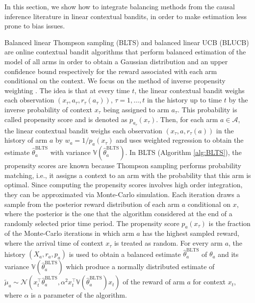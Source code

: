 \documentclass[letterpaper]{article} %
\newcommand{\field}[1]{\mathbb{#1}}
\def\A{\mathcal{A}}
\def\N{\mathcal{N}}
\def\V{\field{V}}
\def\V{\mathbb{V}}
\begin{document}
In this section, we show how to integrate balancing methods from the causal inference literature in linear contextual bandits, in order to make estimation less prone to bias issues.

Balanced linear Thompson sampling (BLTS) and balanced linear UCB (BLUCB) are online contextual bandit algorithms that perform balanced estimation of the model of all arms in order to obtain a Gaussian distribution and an upper confidence bound respectively for the reward associated with each arm conditional on the context.
We focus on the method of inverse propensity weighting \cite{imbens-ci}.
The idea is that at every time $t$, the linear contextual bandit weighs each observation $(x_\tau, a_\tau, r_\tau(a_\tau))$, $\tau = 1, \dots, t$ in the history up to time $t$ by the inverse probability of context $x_\tau$ being assigned to arm $a_\tau$. This probability is called propensity score and is denoted as $p_{a_\tau}(x_\tau)$. Then, for each arm $a \in \A$, the linear contextual bandit weighs each observation $(x_\tau, a, r_\tau(a))$ in the history of arm $a$ by $w_{a} = 1 / p_{a}(x_\tau)$ and uses weighted regression to obtain the estimate $\hat{\theta}^\text{BLTS}_a$ with variance $\V(\hat\theta^\text{BLTS}_a)$.
In BLTS (Algorithm \ref{alg:BLTS}), the propensity scores are known because Thompson sampling performs probability matching, i.e., it assigns a context to an arm with the probability that this arm is optimal.
Since computing the propensity scores involves high order integration, they can be approximated via Monte-Carlo simulation.
Each iteration draws a sample from the posterior reward distribution of each arm $a$ conditional on $x$, where the posterior is the one that the algorithm considered at the end of a randomly selected prior time period.
The propensity score $p_a(x_\tau)$ is the fraction of the Monte-Carlo iterations in which arm $a$ has the highest sampled reward, where the arrival time of context $x_\tau$ is treated as random.
For every arm $a$, the history $(X_a, r_a, p_a)$ is used to obtain a balanced estimate $\hat{\theta}^\text{BLTS}_a$ of $\theta_a$ and its variance $\V(\hat\theta^\text{BLTS}_a)$ which produce a normally distributed estimate of $\tilde{\mu}_a \sim \N\left(x_t^\top \hat{\theta}^\text{BLTS}_a, \alpha^2 x_t^\top \V(\hat\theta^\text{BLTS}_a) x_t\right)$ of the reward of arm $a$ for context $x_t$, where $\alpha$ is a parameter of the algorithm.
\end{document}
